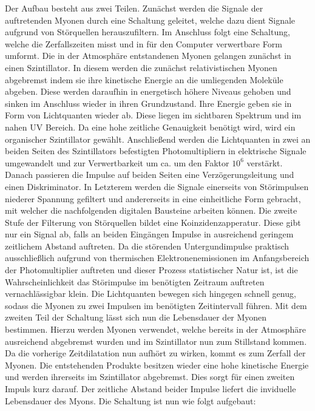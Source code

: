     Der Aufbau besteht aus zwei Teilen. Zunächst werden die Signale der auftretenden Myonen durch eine Schaltung geleitet, welche dazu dient Signale aufgrund von Störquellen herauszufiltern. Im Anschluss folgt eine Schaltung, welche die Zerfallszeiten misst und in für den Computer verwertbare Form umformt. Die in der Atmosphäre entstandenen Myonen gelangen zunächst in einen Szintillator. In diesem werden die zunächst relativistischen  Myonen abgebremst indem sie ihre kinetische Energie an die umliegenden Moleküle abgeben. Diese werden daraufhin in energetisch höhere Niveaus gehoben und sinken im Anschluss wieder in ihren Grundzustand. Ihre Energie geben sie in Form von Lichtquanten wieder ab. Diese liegen im sichtbaren Spektrum und im nahen UV Bereich. Da eine hohe zeitliche Genauigkeit benötigt wird, wird ein organischer Szintillator gewählt. Anschließend werden die Lichtquanten in zwei an beiden Seiten des Szintillators befestigten Photomultipliern in elektrische Signale umgewandelt und zur Verwertbarkeit um ca. um den Faktor $10^6$ verstärkt. Danach passieren die Impulse auf beiden Seiten eine Verzögerungsleitung und einen Diskriminator. In Letzterem werden die Signale einerseits von Störimpulsen niederer Spannung gefiltert und andererseits in eine einheitliche Form gebracht, mit welcher die nachfolgenden digitalen Bausteine arbeiten können. Die zweite Stufe der Filterung von Störquellen bildet eine Koinzidenzapperatur. Diese gibt nur ein Signal ab, falls an beiden Eingängen Impulse in ausreichend geringem zeitlichem Abstand auftreten. Da die störenden Untergundimpulse praktisch ausschließlich aufgrund von thermischen Elektronenemissionen im Anfangsbereich der Photomultiplier auftreten und dieser Prozess statistischer Natur ist, ist die Wahrscheinlichkeit das Störimpulse im benötigten Zeitraum auftreten vernachlässigbar klein. Die Lichtquanten bewegen sich hingegen schnell genug, sodass die Myonen zu zwei Impulsen im benötigten Zeitintervall führen.
    Mit dem zweiten Teil der Schaltung lässt sich nun die Lebensdauer der Myonen bestimmen. Hierzu werden Myonen verwendet, welche bereits in der Atmosphäre ausreichend abgebremst wurden und im Szintillator nun zum Stillstand kommen. Da die vorherige Zeitdilatation nun aufhört zu wirken, kommt es zum Zerfall der Myonen. Die entstehenden Produkte besitzen wieder eine hohe kinetische Energie und werden ihrerseits im Szintillator abgebremst. Dies sorgt für einen zweiten Impuls kurz darauf. Der zeitliche Abstand beider Impulse liefert die inviduelle Lebensdauer des Myons. Die Schaltung ist nun wie folgt aufgebaut:
